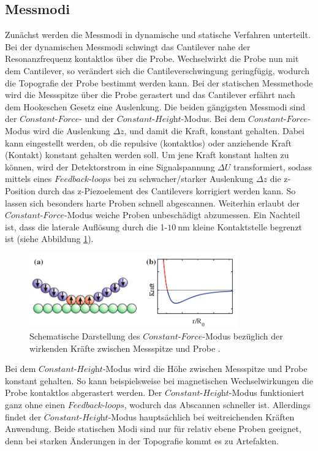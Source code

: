 \subsection{Messmodi}
\label{sec:Messmodi}
Zunächst werden die Messmodi in dynamische und statische Verfahren unterteilt.
Bei der dynamischen Messmodi schwingt das Cantilever nahe der Resonanzfrequenz
kontaktlos über die Probe. Wechselwirkt die Probe nun mit dem Cantilever, so verändert
sich die Cantileverschwingung geringfügig, wodurch die Topografie der Probe bestimmt
werden kann.
Bei der statischen Messmethode wird die Messspitze über die Probe gerastert und
das Cantilever erfährt nach dem Hookeschen Gesetz eine Auslenkung. Die beiden
gängigsten Messmodi sind der $\textit{Constant-Force-}$ und der
$\textit{Constant-Height}$-Modus. Bei dem $\textit{Constant-Force}$-Modus wird
die Auslenkung $\Delta z$, und damit die Kraft, konstant gehalten. Dabei kann
eingestellt werden, ob die repulsive (kontaktlos) oder anziehende Kraft (Kontakt)
konstant gehalten werden soll. Um jene Kraft konstant halten zu können, wird der
Detektorstrom in eine Signalspannung $\Delta U$ transformiert, sodass mittels
eines $\textit{Feedback-loops}$ bei zu schwacher/starker Auslenkung $\Delta z$
die z-Position durch das z-Piezoelement des Cantilevers korrigiert werden kann.
So lassen sich besonders harte Proben schnell abgescannen. Weiterhin erlaubt der
$\textit{Constant-Force}$-Modus weiche Proben unbeschädigt abzumessen. Ein Nachteil
ist, dass die laterale Auflösung durch die 1-$\SI{10}{\nano\meter}$ kleine
Kontaktstelle begrenzt ist (siehe Abbildung \ref{fig:const-force}).

\begin{figure}[H]
	\centering
	\includegraphics[width=0.8\textwidth]{Abb/const-force.png}
	\caption{Schematische Darstellung des $\textit{Constant-Force}$-Modus bezüglich
	der wirkenden Kräfte zwischen Messspitze und Probe \cite[179]{AFM}.}
	\label{fig:const-force}
\end{figure}

\noindent
Bei dem
$\textit{Constant-Height}$-Modus wird die Höhe zwischen Messspitze und Probe
konstant gehalten. So kann beispielsweise bei magnetischen Wechselwirkungen die
Probe kontaktlos abgerastert werden. Der $\textit{Constant-Height}$-Modus funktioniert
ganz ohne einen $\textit{Feedback}${\-}$\textit{-loops}$, wodurch das Abscannen schneller ist.
Allerdings findet der $\textit{Constant-Height}$-Modus hauptsächlich bei weitreichenden
Kräften Anwendung. Beide statischen Modi sind nur für relativ ebene Proben geeignet,
denn bei starken Änderungen in der Topografie kommt es zu Artefakten.


